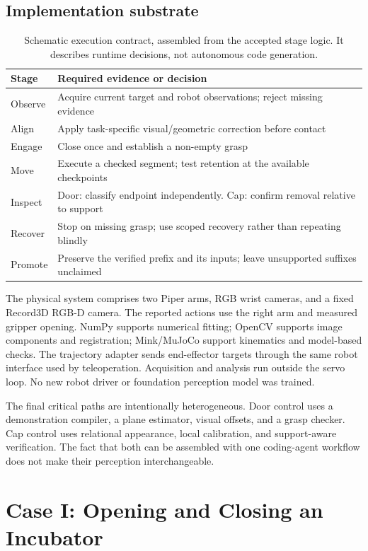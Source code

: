 \subsection{Implementation substrate}
\begin{table}[t]\centering\small
\caption{Schematic execution contract, assembled from the accepted stage
logic. It describes runtime decisions, not autonomous code generation.}
\label{tab:contract}
\begin{tabularx}{\columnwidth}{lY}\toprule
Stage & Required evidence or decision\\\midrule
Observe & Acquire current target and robot observations; reject missing evidence\\
Align & Apply task-specific visual/geometric correction before contact\\
Engage & Close once and establish a non-empty grasp\\
Move & Execute a checked segment; test retention at the available checkpoints\\
Inspect & Door: classify endpoint independently. Cap: confirm removal relative to support\\
Recover & Stop on missing grasp; use scoped recovery rather than repeating blindly\\
Promote & Preserve the verified prefix and its inputs; leave unsupported suffixes unclaimed\\\bottomrule
\end{tabularx}
\end{table}

The physical system comprises two Piper arms, RGB wrist cameras, and a fixed
Record3D RGB-D camera. The reported actions use the right arm and measured
gripper opening. NumPy supports numerical fitting; OpenCV supports image
components and registration; Mink/MuJoCo support kinematics and model-based
checks. The trajectory adapter sends end-effector targets through the same
robot interface used by teleoperation. Acquisition and analysis run outside
the servo loop. No new robot driver or foundation perception model was trained.

The final critical paths are intentionally heterogeneous. Door control uses a
demonstration compiler, a plane estimator, visual offsets, and a grasp checker.
Cap control uses relational appearance, local calibration, and support-aware
verification. The fact that both can be assembled with one coding-agent
workflow does not make their perception interchangeable.

\section{Case I: Opening and Closing an Incubator}
